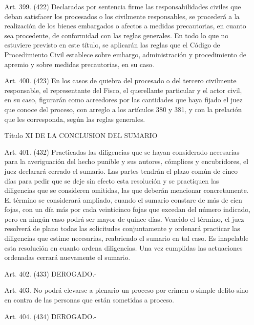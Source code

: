     Art. 399. (422) Declaradas por sentencia firme las responsabilidades civiles que deban satisfacer los procesados o los civilmente responsables, se procederá a la realización de los bienes embargados o afectos a medidas precautorias, en cuanto sea procedente, de conformidad con las reglas generales.
    En todo lo que no estuviere previsto en este título, se aplicarán las reglas que el Código de Procedimiento Civil establece sobre embargo, administración y procedimiento de apremio y sobre medidas precautorias, en su caso.

    Art. 400. (423) En los casos de quiebra del procesado o del tercero civilmente responsable, el representante del Fisco, el querellante particular y el actor civil, en su caso, figurarán como acreedores por las cantidades que haya fijado el juez que conoce del proceso, con arreglo a los artículos 380 y 381, y con la prelación que les corresponda, según las reglas generales.

    Título XI
    DE LA CONCLUSION DEL SUMARIO

    Art. 401. (432) Practicadas las diligencias que se hayan considerado necesarias para la averiguación del hecho punible y sus autores, cómplices y encubridores, el juez declarará cerrado el sumario. Las partes tendrán el plazo común de cinco días para pedir que se deje sin efecto esta resolución y se practiquen las diligencias que se consideren omitidas, las que deberán mencionar concretamente.
    El término se considerará ampliado, cuando el sumario constare de más de cien fojas, con un día más por cada veinticinco fojas que excedan del número indicado, pero en ningún caso podrá ser mayor de quince días.
    Vencido el término, el juez resolverá de plano todas las solicitudes conjuntamente y ordenará practicar las diligencias que estime necesarias, reabriendo el sumario en tal caso. Es inapelable esta resolución en cuanto ordena diligencias.
    Una vez cumplidas las actuaciones ordenadas cerrará nuevamente el sumario.

    Art. 402. (433) DEROGADO.-


    Art. 403. No podrá elevarse a plenario un proceso por crimen o simple delito sino en contra de las personas que están sometidas a proceso.

    Art. 404. (434) DEROGADO.-


